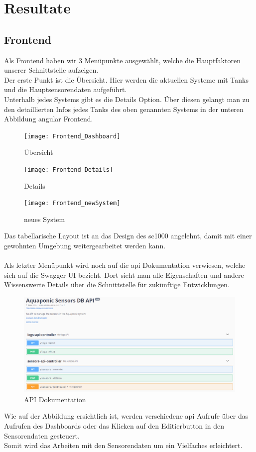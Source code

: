 \documentclass[../main.tex]{subfiles}
\begin{document}
	\section{Resultate}
	
	\subsection{Frontend}
	
	Als Frontend haben wir 3 Menüpunkte ausgewählt, welche die Hauptfaktoren unserer Schnittstelle aufzeigen. \\
	Der erste Punkt ist die Übersicht. Hier werden die aktuellen Systeme mit Tanks und die Hauptsensorendaten aufgeführt. \\
	Unterhalb jedes Systems gibt es die Details Option. Über diesen gelangt man zu den detaillierten Infos jedes Tanks des oben genannten Systems in der unteren Abbildung \gls{angular} Frontend. 
	\begin{figure}[H]
		\centering
		\texttt{[image: Frontend\_Dashboard]}
		\caption{Übersicht}
		\label{fig:Frontend_Dashboard}
	\end{figure}
	\begin{figure}[H]
		\centering
		\texttt{[image: Frontend\_Details]}
		\caption{Details}
		\label{fig:Frontend_Details}
	\end{figure}	
	\begin{figure}[H]
		\centering
		\texttt{[image: Frontend\_newSystem]}
		\caption{neues System}
		\label{fig:Frontend_newSystem}
	\end{figure}
	\par
	\noindent	
	Das tabellarische Layout ist an das Design des \gls{sc1000} angelehnt, damit mit einer gewohnten Umgebung weitergearbeitet werden kann. 
	\\ \\
	Als letzter Menüpunkt wird noch auf die \gls{api} Dokumentation verwiesen, welche sich auf die Swagger UI bezieht. Dort sieht man alle Eigenschaften und andere Wissenswerte Details über die Schnittstelle für zukünftige Entwicklungen.\par 
	\begin{figure}[H]
		\centering
		\includegraphics[scale=0.4]{../images/API_Documentation}
		\caption{API Dokumentation}
		\label{fig:API_Documentation}
	\end{figure}
	\noindent
	Wie auf der Abbildung ersichtlich ist, werden verschiedene \gls{api} Aufrufe über das Aufrufen des Dashboards oder das Klicken auf den Editierbutton in den Sensorendaten gesteuert. 
	\\
	Somit wird das Arbeiten mit den Sensorendaten um ein Vielfaches erleichtert.
	
\end{document}
